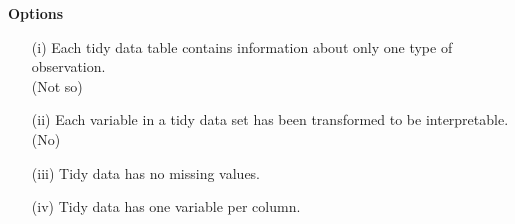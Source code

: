 \documentclass{beamer}
\begin{document}
\begin{frame}


\textbf{Options}
\begin{itemize}
	\item[(i)]  Each tidy data table contains information about only one type of observation.\\
	(Not so)
	
	\item[(ii)]  Each variable in a tidy data set has been transformed to be interpretable.
	(No)
	
	\item[(iii)]  Tidy data has no missing values.
	
	\item[(iv)]  Tidy data has one variable per column.
\end{itemize}
\end{frame}
\end{document}
